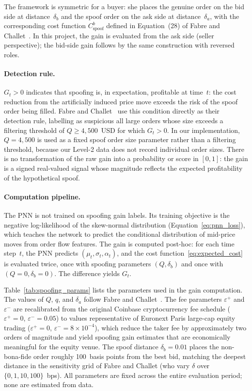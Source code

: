 \documentclass[11pt]{report}
\begin{document}
The framework is symmetric for a buyer: she places the genuine order on the bid side at distance~$\delta_b$ and the spoof order on the ask side at distance~$\delta_a$, with the corresponding cost function $C^b_{\text{spoof}}$ defined in Equation~(28) of Fabre and Challet~\cite{fabre_2025}. In this project, the gain is evaluated from the ask side (seller perspective); the bid-side gain follows by the same construction with reversed roles.

\paragraph{Detection rule.}
$G_t > 0$ indicates that spoofing is, in expectation, profitable at time~$t$: the cost reduction from the artificially induced price move exceeds the risk of the spoof order being filled. Fabre and Challet~\cite{fabre_2025} use this condition directly as their detection rule, labelling as suspicious all large orders whose size exceeds a filtering threshold of $Q \geq 4{,}500$~USD for which $G_t > 0$. In our implementation, $Q = 4{,}500$ is used as a fixed spoof order size parameter rather than a filtering threshold, because our Level-2 data does not record individual order sizes. There is no transformation of the raw gain into a probability or score in $[0,1]$: the gain is a signed real-valued signal whose magnitude reflects the expected profitability of the hypothetical spoof.

\paragraph{Computation pipeline.}
The PNN is not trained on spoofing gain labels. Its training objective is the negative log-likelihood of the skew-normal distribution (Equation~\eqref{eq:pnn_loss}), which teaches the network to predict the conditional distribution of mid-price moves from order flow features. The gain is computed post-hoc: for each time step~$t$, the PNN predicts $(\mu_t, \sigma_t, \alpha_t)$, and the cost function~\eqref{eq:expected_cost} is evaluated twice, once with spoofing parameters $(Q, \delta_b)$ and once with $(Q{=}0, \delta_b{=}0)$. The difference yields $G_t$.

Table~\ref{tab:spoofing_params} lists the parameters used in the gain computation. The values of $Q$, $q$, and $\delta_a$ follow Fabre and Challet~\cite{fabre_2025}. The fee parameters $\varepsilon^+$ and $\varepsilon^-$ are recalibrated from the original Coinbase cryptocurrency fee schedule ($\varepsilon^+ = 0$, $\varepsilon^- = 0.05$) to values representative of Euronext Paris large-cap equity trading ($\varepsilon^+ = 0$, $\varepsilon^- = 8 \times 10^{-4}$), which reduce the taker fee by approximately two orders of magnitude and yield spoofing gain estimates that are economically meaningful for the equity venue. The spoof distance $\delta_b = 0.01$ places the non-bona-fide order roughly 100~basis points from the best bid, matching the deepest distance in the sensitivity grid of Fabre and Challet (who vary $\delta$ over $\{0, 1, 10, 100\}$~bps).
All parameters are fixed across the entire evaluation period; none are estimated from data.
\end{document}
